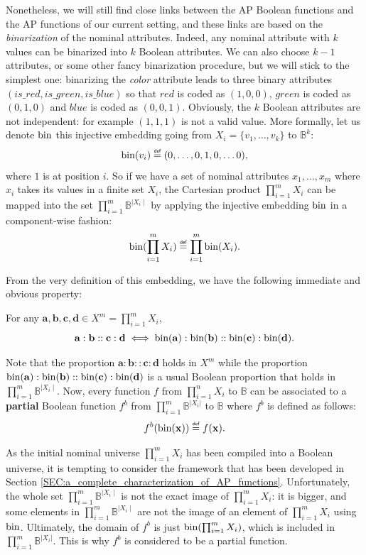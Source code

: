 Nonetheless, we will still find close links between the AP Boolean functions
and the AP functions of our current setting, and these links are based on the
\textit{binarization} of the nominal attributes. Indeed, any nominal attribute
with $k$ values can be binarized into $k$ Boolean attributes. We can also choose
$k- 1$ attributes, or some other fancy binarization procedure, but we will
stick to the simplest one:
binarizing the \textit{color} attribute leads to three binary attributes
$(is\_red, is\_green, is\_blue)$ so that $red$ is coded as $(1, 0, 0)$,
$green$ is coded as $(0, 1 , 0)$ and $blue$ is coded as $(0, 0, 1)$. Obviously,
the $k$ Boolean attributes are not independent: for example $(1, 1, 1)$  is not
a valid value.  More formally, let us denote $\text{bin}$ this injective embedding
going from $X_i=\{v_1, \dots, v_k\}$ to $\mathbb{B}^k$:
$$\bin(v_i) \eqdef (0, \dots, 0, 1, 0, \dots 0),$$
where $1$ is at position $i$.  So if we have a set of nominal attributes $x_1,
\dots, x_m$ where $x_i$ takes its values in a finite set $X_i$, the Cartesian
product  $\prod_{i=1}^m X_i$ can be mapped into the set $\prod_{i=1}^m
\mathbb{B}^{\mid X_i \mid}$ by applying the injective embedding $\text{bin}$ in a
component-wise fashion:
$$\bin(\prod_{i=1}^m X_i) \eqdef \prod_{i=1}^m  \bin(X_i).$$

From the very definition of this embedding, we have the following immediate and
obvious property:
\begin{property}
  \label{PROPER:analogy_nominal_iff_analogy_bin}
  For any $\mathbf{a}, \mathbf{b}, \mathbf{c}, \mathbf{d} \in X^m =
  \prod_{i=1}^m X_i$,
$$\mathbf{a}: \mathbf{b}:: \mathbf{c}: \mathbf{d} \iff
 \text{bin}(\mathbf{a}): \text{bin}(\mathbf{b}):: \text{bin}(\mathbf{c}):
  \text{bin}(\mathbf{d}).$$
 \end{property}
 \noindent
 Note that the proportion $\mathbf{a}: \mathbf{b}:: \mathbf{c}: \mathbf{d}$
 holds in $X^m$ while the proportion $\text{bin}(\mathbf{a}): \text{bin}(\mathbf{b})::
 \text{bin}(\mathbf{c}): \text{bin}(\mathbf{d})$ is a usual Boolean proportion that holds
 in $\prod_{i=1}^m\mathbb{B}^{\mid X_i \mid}$.  Now, every function $f$ from
 $\prod_{i=1}^n X_i$ to $\mathbb{B}$ can be associated to a \textbf{partial}
 Boolean function $f^b$ from $\prod_{i=1}^m \mathbb{B}^{|X_i|}$ to $\mathbb{B}$
 where $f^b$ is defined as follows:
$$
f^b(\bin(\mathbf{x})) \eqdef f(\mathbf{x}).
$$

As the initial nominal universe  $\prod_{i=1}^m X_i$  has been compiled into a
Boolean universe, it is tempting to consider the framework that has been
developed in Section \ref{SEC:a_complete_characterization_of_AP_functions}.
Unfortunately, the whole set $\prod_{i=1}^m \mathbb{B}^{\mid X_i\mid}$ is not
the exact image of $\prod_{i=1}^m X_i$: it is bigger, and some elements in
$\prod_{i=1}^m  \mathbb{B}^{\mid X_i\mid}$ are not the image of an element of
$\prod_{i=1}^m X_i$ using $\text{bin}$.  Ultimately, the domain of $f^b$ is just
$\text{bin}(\prod_{i=1}^m X_i)$, which is included in $\prod_{i=1}^m
\mathbb{B}^{|X_i|}$. This is why $f^b$ is considered to be a partial function.

